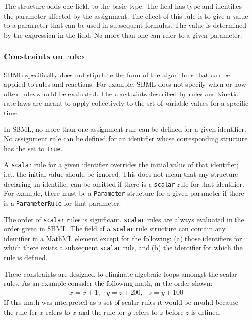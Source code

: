 \documentclass[10pt,twocolumntoc]{cekarticle}
\begin{document}
\subsubsection{}

The  structure adds one field,  to
the basic  type.  The  field
has type  and identifies the parameter affected by the
assignment.  The effect of this rule is to give a value to a parameter that
can be used in subsequent formulas.  The value is determined by the
expression in the  field.  No more than one
 can refer to a given parameter.


\subsubsection{Constraints on rules}
\label{sec:ruleconstraints}

SBML specifically does not stipulate the form of the algorithms that can be
applied to rules and reactions.  For example, SBML does not specify when or
how often rules should be evaluated.  The constraints described by rules
and kinetic rate laws are meant to apply collectively to the set of
variable values for a specific time.

In SBML, no more than one assignment rule can be defined for a given
identifier.  No assignment rule can be defined for an identifier whose
corresponding structure has the  set to \texttt{true}.

A \texttt{scalar} rule for a given identifier overrides the initial value
of that identifier; i.e., the initial value should be ignored.  This does
not mean that any structure declaring an identifier can be omitted if there
is a \texttt{scalar} rule for that identifier.  For example, there must be
a \texttt{Parameter} structure for a given parameter if there is a
\texttt{ParameterRule} for that parameter.

The order of \texttt{scalar} rules is significant.  \texttt{scalar} rules
are always evaluated in the order given in SBML.  The  field
of a \texttt{scalar} rule structure can contain any identifier in a MathML
 element except for the following: (a) those identifiers for
which there exists a subsequent \texttt{scalar} rule, and (b)
the identifier for which the rule is defined.

These constraints are designed to eliminate algebraic loops amongst the
scalar rules.  As an example consider the following math, in the order
shown:
\begin{equation*}
  \begin{array}{lll}
    x = x + 1, & y = z + 200, & z = y + 100
  \end{array}
\end{equation*}
If this math was interpreted as a set of scalar rules it would be invalid
because the rule for $x$ refers to $x$ and the rule for $y$ refers to $z$
before $z$ is defined.
\end{document}
